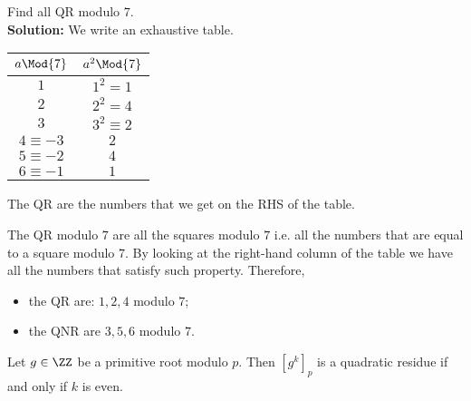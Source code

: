 \documentclass[12pt, a4paper]{article}
\begin{document}
\begin{mdexample}
    Find all QR modulo \(7\). \\
    \textbf{Solution:} We write an exhaustive table.
        \begin{table}[H]
            \begin{center}
                \begin{tabular}{c|c}
                    \(a \Mod{7}\) & \(a^2 \Mod{7}\) \\ \hline
                    \(1\)          &      \(1^2=1\)      \\
                    \(2\)          &      \(2^2=4\)      \\
                    \(3\)          &        \(3^2 \equiv 2\)    \\
                    \(4 \equiv -3\) &   \(2\)         \\
                    \(5 \equiv -2\) &      \(4\)      \\
                    \(6 \equiv -1\) &         \(1\)  
                    \end{tabular}
            \end{center}
        \end{table}
    \begin{mdremark}
        The QR are the numbers that we get on the RHS of the table.
    \end{mdremark}
    The QR modulo \(7\) are all the squares modulo \(7\) i.e. all the numbers that are equal to a square modulo \(7\). By looking at the right-hand column of the table we have all the numbers that satisfy such property. Therefore, 
    \begin{itemize}
        \item the QR are: \(1,2,4\) modulo \(7\);
        \item the QNR are \(3,5,6\) modulo \(7\).
    \end{itemize}
\end{mdexample}


\begin{mdprop}
    Let \(g \in \ZZ\) be a primitive root modulo \(p\). Then \([g^k]_p\) is a quadratic residue if and only if \(k\) is even.
\end{mdprop}
\end{document}
